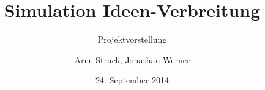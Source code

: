 \documentclass{beamer}
\title{Simulation Ideen-Verbreitung}
\subtitle{Projektvorstellung}
\author{Arne Struck, Jonathan Werner}
\institute{Universität Hamburg, Fachschaft Informatik, Praktikum paralleles Programmieren}
\date{24. September 2014}
\begin{document}
\begin{frame}[plain]
	\titlepage
\end{frame}
	






\end{document}
